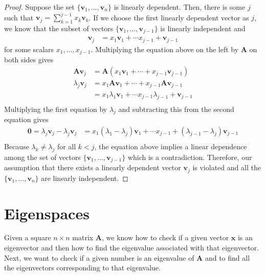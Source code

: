 \documentclass[
]{book}
\theoremstyle{definition}
\theoremstyle{definition}
\theoremstyle{definition}
\theoremstyle{remark}
\begin{document}
\begin{proof}

Suppose the set \(\{\mathbf{v}_1, \ldots, \mathbf{v}_n\}\) is linearly dependent. Then, there is some \(j\) such that \(\mathbf{v}_j = \sum_{k = 1}^{j-1} x_k \mathbf{v}_k\). If we choose the first linearly dependent vector as \(j\), we know that the subset of vectors \(\{\mathbf{v}_1, \ldots, \mathbf{v}_{j-1}\}\) is linearly independent and
\[
\begin{aligned}
\mathbf{v}_j & = x_1 \mathbf{v}_1 + \cdots x_{j-1} + \mathbf{v}_{j-1}
\end{aligned}
\]
for some scalars \(x_1, \ldots, x_{j-1}\). Multiplying the equation above on the left by \(\mathbf{A}\) on both sides gives
\[
\begin{aligned}
\mathbf{A}\mathbf{v}_j & = \mathbf{A} (x_1 \mathbf{v}_1 + \cdots + x_{j-1} \mathbf{v}_{j-1}) \\
\lambda_j \mathbf{v}_j & = x_1 \mathbf{A} \mathbf{v}_1 + \cdots + x_{j-1} \mathbf{A} \mathbf{v}_{j-1} \\
& =  x_1 \lambda_1 \mathbf{v}_1 + \cdots x_{j-1} \lambda_{j-1} + \mathbf{v}_{j-1} \\
\end{aligned}
\]
Multiplying the first equation by \(\lambda_j\) and subtracting this from the second equation gives
\[
\begin{aligned}
\mathbf{0} = \lambda_j \mathbf{v}_j - \lambda_j \mathbf{v}_j 
& = x_1 (\lambda_1 - \lambda_j) \mathbf{v}_1 + \cdots x_{j-1} + (\lambda_{j-1} - \lambda_j) \mathbf{v}_{j-1} \\
\end{aligned}
\]
Because \(\lambda_k \neq \lambda_j\) for all \(k < j\), the equation above implies a linear dependence among the set of vectors \(\{\mathbf{v}_1, \ldots, \mathbf{v}_{j-1}\}\) which is a contradiction. Therefore, our assumption that there exists a linearly dependent vector \(\mathbf{v}_j\) is violated and all the \(\{\mathbf{v}_1, \ldots, \mathbf{v}_n\}\) are linearly independent.

\end{proof}

\hypertarget{eigenspaces}{%
\section{Eigenspaces}\label{eigenspaces}}

Given a square \(n \times n\) matrix \(\mathbf{A}\), we know how to check if a given vector \(\mathbf{x}\) is an eigenvector and then how to find the eigenvalue associated with that eigenvector. Next, we want to check if a given number is an eigenvalue of \(\mathbf{A}\) and to find all the eigenvectors corresponding to that eigenvalue.
\end{document}
